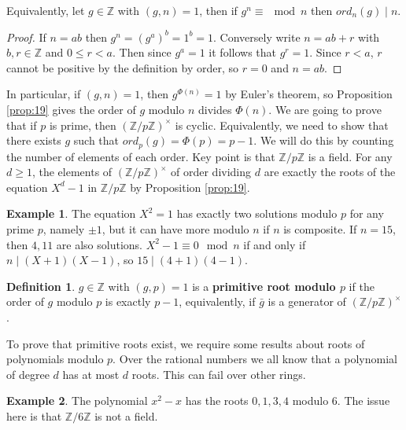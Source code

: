 \documentclass{article}
\newcommand{\Z}{\mathbb{Z}}
\newcommand{\rb}[1]{\left( #1 \right)}
\newcommand{\unit}[1]{\rb{\Z / #1\Z}^\times}
\theoremstyle{definition}\newtheorem{definition}{Definition}
\theoremstyle{definition}\newtheorem*{remark}{Remark}
\theoremstyle{definition}\newtheorem*{example}{Example}
\theoremstyle{definition}\newtheorem*{note}{Note}
\begin{document}
Equivalently, let $ g \in \Z $ with $ \rb{g, n} = 1 $, then if $ g^n \equiv \mod n $ then $ ord_n\rb{g} \mid n $.

\begin{proof}
If $ n = ab $ then $ g^n = \rb{g^a}^b = 1^b = 1 $. Conversely write $ n = ab + r $ with $ b, r \in \Z $ and $ 0 \le r < a $. Then since $ g^a = 1 $ it follows that $ g^r = 1 $. Since $ r < a $, $ r $ cannot be positive by the definition by order, so $ r = 0 $ and $ n = ab $.
\end{proof}

In particular, if $ \rb{g, n} = 1 $, then $ g^{\Phi\rb{n}} = 1 $ by Euler's theorem, so Proposition \ref{prop:19} gives the order of $ g $ modulo $ n $ divides $ \Phi\rb{n} $. We are going to prove that if $ p $ is prime, then $ \unit{p} $ is cyclic. Equivalently, we need to show that there exists $ g $ such that $ ord_p\rb{g} = \Phi\rb{p} = p - 1 $. We will do this by counting the number of elements of each order. Key point is that $ \Z / p\Z $ is a field. For any $ d \ge 1 $, the elements of $ \unit{p} $ of order dividing $ d $ are exactly the roots of the equation $ X^d - 1 $ in $ \Z / p\Z $ by Proposition \ref{prop:19}.

\begin{example}
The equation $ X^2 = 1 $ has exactly two solutions modulo $ p $ for any prime $ p $, namely $ \pm 1 $, but it can have more modulo $ n $ if $ n $ is composite. If $ n = 15 $, then $ 4, 11 $ are also solutions. $ X^2 - 1 \equiv 0 \mod n $ if and only if $ n \mid \rb{X + 1}\rb{X - 1} $, so $ 15 \mid \rb{4 + 1}\rb{4 - 1} $.
\end{example}

\begin{definition}
$ g \in \Z $ with $ \rb{g, p} = 1 $ is a \textbf{primitive root modulo $ p $} if the order of $ g $ modulo $ p $ is exactly $ p - 1 $, equivalently, if $ \bar{g} $ is a generator of $ \unit{p} $.
\end{definition}

To prove that primitive roots exist, we require some results about roots of polynomials modulo $ p $. Over the rational numbers we all know that a polynomial of degree $ d $ has at most $ d $ roots. This can fail over other rings.

\begin{example}
The polynomial $ x^2 - x $ has the roots $ 0, 1, 3, 4 $ modulo $ 6 $. The issue here is that $ \Z / 6\Z $ is not a field.
\end{example}
\end{document}
